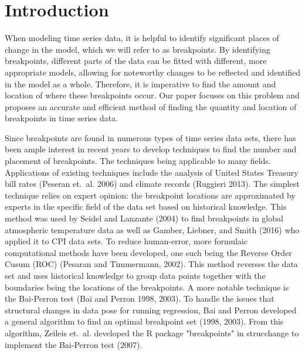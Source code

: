 \documentclass[submit]{smj}
\begin{document}
\maketitle


\section{Introduction}
When modeling time series data, it is helpful to identify significant places of change in the model, which we will refer to as breakpoints. By identifying breakpoints, different parts of the data can be fitted with different, more appropriate models, allowing for noteworthy changes to be reflected and identified in the model as a whole. Therefore, it is imperative to find the amount and location of where these breakpoints occur. Our paper focuses on this problem and proposes an accurate and efficient method of finding the quantity and location of breakpoints in time series data.

Since breakpoints are found in numerous types of time series data sets, there has been ample interest in recent years to develop techniques to find the number and placement of breakpoints. The techniques being applicable to many fields. Applications of existing techniques include the analysis of United States Treasury bill rates (Peseran et.~al. 2006) and climate records (Ruggieri 2013).  The simplest technique relies on expert opinion: the breakpoint locations are approximated by experts in the specific field of the data set based on historical knowledge. This method was used by Seidel and Lanzante (2004) to find breakpoints in global atmospheric temperature data as well as Gamber, Liebner, and Smith (2016) who applied it to CPI data sets. To reduce human-error, more formulaic computational methods have been developed, one such being the Reverse Order Cusum (ROC) (Pesaran and Timmermann, 2002).  This method reverses the data set and uses historical knowledge to group data points together with the boundaries being the locations of the breakpoints. A more notable technique is the Bai-Perron test (Bai and Perron 1998, 2003). To handle the issues that structural changes in data pose for running regression, Bai and Perron developed a general algorithm to find an optimal breakpoint set (1998, 2003). From this algorithm, Zeileis et.~al. developed the R package "breakpoints" in strucchange to implement the Bai-Perron test (2007).  
\end{document}
